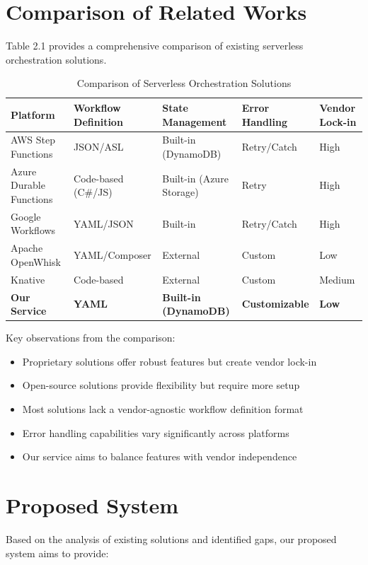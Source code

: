 \documentclass{fisatprojectfinal}
\begin{document}
\section{Comparison of Related Works}
Table 2.1 provides a comprehensive comparison of existing serverless orchestration solutions.

\begin{table}[h!]
\centering
\caption{Comparison of Serverless Orchestration Solutions}
\begin{tabular}{|p{2.5cm}|p{2cm}|p{2.2cm}|p{2.2cm}|p{2.2cm}|}
\hline
\textbf{Platform} & \textbf{Workflow Definition} & \textbf{State Management} & \textbf{Error Handling} & \textbf{Vendor Lock-in} \\
\hline
AWS Step Functions & JSON/ASL & Built-in (DynamoDB) & Retry/Catch & High \\
Azure Durable Functions & Code-based (C\#/JS) & Built-in (Azure Storage) & Retry & High \\
Google Workflows & YAML/JSON & Built-in & Retry/Catch & High \\
Apache OpenWhisk & YAML/Composer & External & Custom & Low \\
Knative & Code-based & External & Custom & Medium \\
\textbf{Our Service} & \textbf{YAML} & \textbf{Built-in (DynamoDB)} & \textbf{Customizable} & \textbf{Low} \\
\hline
\end{tabular}
\end{table}

Key observations from the comparison:
\begin{itemize}
    \item Proprietary solutions offer robust features but create vendor lock-in
    \item Open-source solutions provide flexibility but require more setup
    \item Most solutions lack a vendor-agnostic workflow definition format
    \item Error handling capabilities vary significantly across platforms
    \item Our service aims to balance features with vendor independence
\end{itemize}

\section{Proposed System}
Based on the analysis of existing solutions and identified gaps, our proposed system aims to provide:
\end{document}
